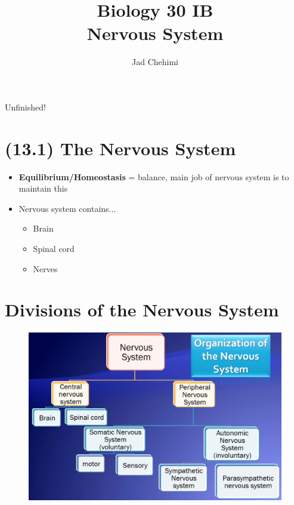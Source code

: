 \documentclass[a4paper,12pt]{article}
\title{Biology 30 IB \\ Nervous System}
\author{Jad Chehimi}
\begin{document}
\maketitle

\begin{center}
\Huge
Unfinished!
\normalsize
\end{center}

\tableofcontents

\pagebreak

\section{(13.1) The Nervous System}
\begin{itemize}
    \item{\textbf{Equilibrium/Homeostasis} = balance, main job of nervous system is to maintain this}
    \item{
            Nervous system contains...
            \begin{itemize}
                \item{Brain}
                \item{Spinal cord}
                \item{Nerves}
            \end{itemize}
        }
\end{itemize}

\section{Divisions of the Nervous System}
\begin{figure}[H]
    \centering
    \includegraphics[width=\textwidth]{flowchart}
\end{figure}
\end{document}

